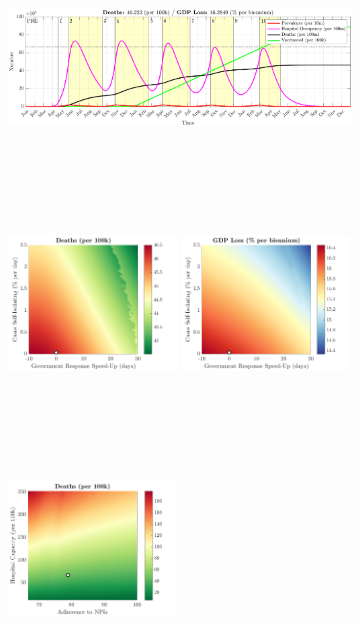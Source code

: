 \documentclass[paper=a4, fontsize=11pt]{scrartcl}
\numberwithin{figure}{section}
\numberwithin{table}{section}
\begin{document}
\begin{figure}[H]
\centering
    \begin{subfigure}[b]{\textwidth}
     	\includegraphics[width=\textwidth,height=5.5cm]{Counterfactuals/CN_sars}
    \end{subfigure}
    \begin{subfigure}[b]{\textwidth}
      	\includegraphics[width=0.49\textwidth,height=6cm]{CN/SARS/ero_d}
	\hspace{0.05cm}
    	\includegraphics[width=0.49\textwidth,height=6cm]{CN/SARS/ero_g}
    \end{subfigure}
    \begin{subfigure}[b]{\textwidth}
      	\includegraphics[width=0.49\textwidth,height=6cm]{CN/SARS/npl_d}

\end{subfigure}
\end{figure}
\end{document}

